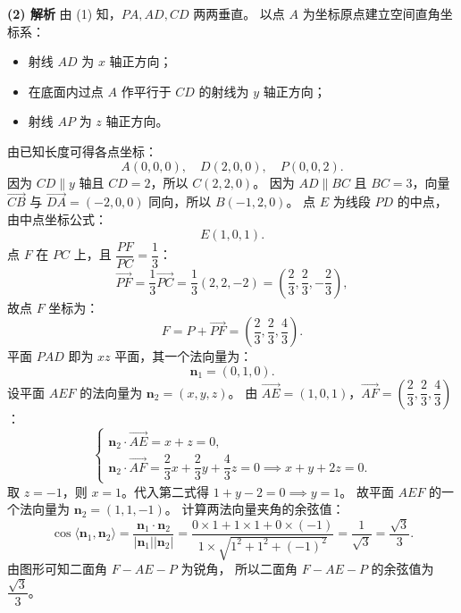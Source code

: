 \begin{answer}
\textbf{(2) 解析}
由 (1) 知，$PA, AD, CD$ 两两垂直。
以点 $A$ 为坐标原点建立空间直角坐标系：
\begin{itemize}
\item 射线 $AD$ 为 $x$ 轴正方向；
\item 在底面内过点 $A$ 作平行于 $CD$ 的射线为 $y$ 轴正方向；
\item 射线 $AP$ 为 $z$ 轴正方向。
\end{itemize}
由已知长度可得各点坐标：
\nopagebreak[4]
\[A(0, 0, 0), \quad D(2, 0, 0), \quad P(0, 0, 2).\]
因为 $CD \parallel y$ 轴且 $CD = 2$，所以 $C(2, 2, 0)$。
因为 $AD \parallel BC$ 且 $BC = 3$，向量 $\vec{CB}$ 与 $\vec{DA} = (-2, 0, 0)$ 同向，所以 $B(-1, 2, 0)$。
点 $E$ 为线段 $PD$ 的中点，由中点坐标公式：
\nopagebreak[4]
\[E(1, 0, 1).\]
点 $F$ 在 $PC$ 上，且 $\dfrac{PF}{PC} = \dfrac{1}{3}$：
\nopagebreak[4]
\[\vec{PF} = \frac{1}{3}\vec{PC} = \frac{1}{3}(2, 2, -2) = \left(\frac{2}{3}, \frac{2}{3}, -\frac{2}{3}\right),\]
故点 $F$ 坐标为：
\nopagebreak[4]
\[F = P + \vec{PF} = \left(\frac{2}{3}, \frac{2}{3}, \frac{4}{3}\right).\]
平面 $PAD$ 即为 $xz$ 平面，其一个法向量为：
\nopagebreak[4]
\[\boldsymbol{n}_1 = (0, 1, 0).\]
设平面 $AEF$ 的法向量为 $\boldsymbol{n}_2 = (x, y, z)$。
由 $\vec{AE} = (1, 0, 1)$，$\vec{AF} = \left(\dfrac{2}{3}, \dfrac{2}{3}, \dfrac{4}{3}\right)$：
\nopagebreak[4]
\[\begin{cases} \boldsymbol{n}_2 \cdot \vec{AE} = x + z = 0, \\ \boldsymbol{n}_2 \cdot \vec{AF} = \dfrac{2}{3}x + \dfrac{2}{3}y + \dfrac{4}{3}z = 0 \implies x + y + 2z = 0. \end{cases}\]
取 $z = -1$，则 $x = 1$。代入第二式得 $1 + y - 2 = 0 \implies y = 1$。
故平面 $AEF$ 的一个法向量为 $\boldsymbol{n}_2 = (1, 1, -1)$。
计算两法向量夹角的余弦值：
\nopagebreak[4]
\[\cos\langle\boldsymbol{n}_1, \boldsymbol{n}_2\rangle = \frac{\boldsymbol{n}_1 \cdot \boldsymbol{n}_2}{|\boldsymbol{n}_1||\boldsymbol{n}_2|} = \frac{0 \times 1 + 1 \times 1 + 0 \times (-1)}{1 \times \sqrt{1^2 + 1^2 + (-1)^2}} = \frac{1}{\sqrt{3}} = \frac{\sqrt{3}}{3}.\]
由图形可知二面角 $F - AE - P$ 为锐角，
所以二面角 $F - AE - P$ 的余弦值为 $\dfrac{\sqrt{3}}{3}$。


\end{answer}
